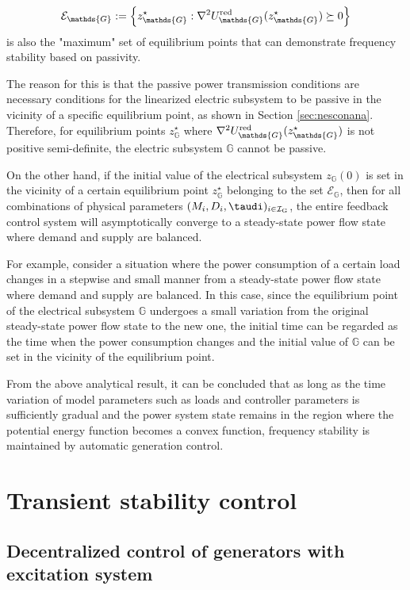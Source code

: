 \documentclass[graybox, envcountchap]{svmult}
\begin{document}
\[
  \mathcal{E}_{\mathds{G}}:=
  \left\{
  z_{\mathds{G}}^{\star} : \nabla^2 U_{\mathds{G}}^{\rm red} (z_{\mathds{G}}^{\star}) 
  \succeq 0
  \right\}
\]
is also the "maximum" set of equilibrium points that can demonstrate frequency
stability based on passivity.

The reason for this is that the passive power transmission conditions are
necessary conditions for the linearized electric subsystem to be passive in the
vicinity of a specific equilibrium point, as shown in Section
\ref{sec:nesconana}.  Therefore, for equilibrium points $z_{\mathds{G}}^{\star}$
where $\nabla^2 U_{\mathds{G}}^{\rm red} (z_{\mathds{G}}^{\star}) $ is not
positive semi-definite, the electric subsystem $\mathds{G}$ cannot be passive.

On the other hand, if the initial value of the electrical subsystem
$z_{\mathds{G}}(0)$ is set in the vicinity of a certain equilibrium point
$z_{\mathds{G}}^{\star}$ belonging to the set $\mathcal{E}_{\mathds{G}}$, then
for all combinations of physical parameters $(M_i, D_i, \taudi)_{i \in
\mathcal{I}_{\rm G}}$, the entire feedback control system will asymptotically
converge to a steady-state power flow state where demand and supply are
balanced.

For example, consider a situation where the power consumption of a certain load
changes in a stepwise and small manner from a steady-state power flow state
where demand and supply are balanced. In this case, since the equilibrium point
of the electrical subsystem $\mathds{G}$ undergoes a small variation from the
original steady-state power flow state to the new one, the initial time can be
regarded as the time when the power consumption changes and the initial value of
$\mathds{G}$ can be set in the vicinity of the equilibrium point.

From the above analytical result, it can be concluded that as long as the time
variation of model parameters such as loads and controller parameters is
sufficiently gradual and the power system state remains in the region where the
potential energy function becomes a convex function, frequency stability is
maintained by automatic generation control.

\section{Transient stability control}\label{sec:transcont}

\subsection{Decentralized control of generators with excitation system}
\end{document}
